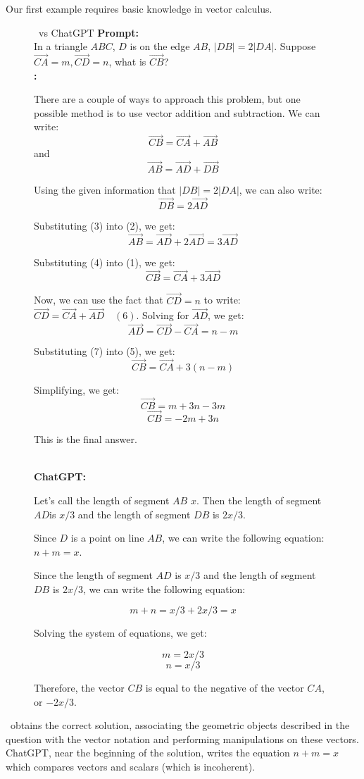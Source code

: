 Our first example requires basic knowledge in vector calculus.
\begin{figure}[H]
\begin{AIbox}{\DV \ vs ChatGPT}
{\bf Prompt:} \\
{\scriptsize
In a triangle $ABC$, $D$ is on the edge $AB$, $|DB| = 2|DA|$. Suppose $\vec{CA} = m, \vec{CD} = n$, what is $\vec{CB}$?
} \\

{\bf \DV:} \\
{\scriptsize
There are a couple of ways to approach this problem, but one possible method is to use vector addition and subtraction. We can write:
\[\vec{CB} = \vec{CA} + \vec{AB} \tag{1}\]
and
\[\vec{AB} = \vec{AD} + \vec{DB} \tag{2}\]

Using the given information that $|DB| = 2|DA|$, we can also write:
\[\vec{DB} = 2\vec{AD} \tag{3}\]

Substituting (3) into (2), we get:
\[\vec{AB} = \vec{AD} + 2\vec{AD} = 3\vec{AD} \tag{4}\]

Substituting (4) into (1), we get:
\[\vec{CB} = \vec{CA} + 3\vec{AD} \tag{5}\]

Now, we can use the fact that $\vec{CD} = n$ to write:
$\vec{CD} = \vec{CA} + \vec{AD} \quad (6)$. Solving for $\vec{AD}$, we get:
\[\vec{AD} = \vec{CD} - \vec{CA} = n - m \tag{7}\]

Substituting (7) into (5), we get:
\[\vec{CB} = \vec{CA} + 3(n - m) \tag{8}\]

Simplifying, we get:
\[\vec{CB} = m + 3n - 3m \tag{9}\]
\[\vec{CB} = -2m + 3n \tag{10}\]

This is the final answer.
}\\

{\bf ChatGPT:} \\
{\scriptsize


Let's call the length of segment $AB$ $x$. Then the length of segment $AD $is $x/3$ and the length of segment $DB$ is $2x/3$.

Since $D$ is a point on line $AB$, we can write the following equation:
$n + m = x$.

Since the length of segment $AD$ is $x/3$ and the length of segment $DB$ is $2x/3$, we can write the following equation:

$$m + n = x/3 + 2x/3 = x$$

Solving the system of equations, we get:

$$m = 2x/3$$
$$n = x/3$$

Therefore, the vector $CB$ is equal to the negative of the vector $CA$, or $-2x/3$.


}
\end{AIbox}
\end{figure}
\DV \ obtains the correct solution, associating the geometric objects described in the question with the vector notation and performing manipulations on these vectors. ChatGPT, near the beginning of the solution, writes the equation $n + m = x$ which compares vectors and scalars (which is incoherent).

